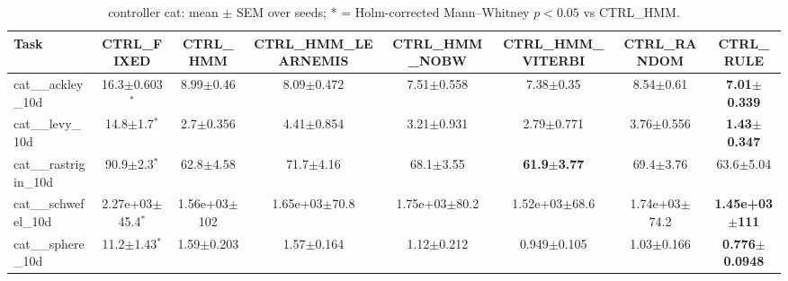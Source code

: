 \begin{table}[t]
\caption{controller cat: mean $\pm$ SEM over seeds; * = Holm-corrected Mann--Whitney $p<0.05$ vs CTRL_HMM.}
\label{tab:controller_cat}
\begin{center}\small
\begin{tabular}{lccccccc}
\hline
Task & CTRL\_FIXED & CTRL\_HMM & CTRL\_HMM\_LEARNEMIS & CTRL\_HMM\_NOBW & CTRL\_HMM\_VITERBI & CTRL\_RANDOM & CTRL\_RULE \\
\hline
cat\_\_ackley\_10d & 16.3$\pm$0.603$^{*}$ & 8.99$\pm$0.46 & 8.09$\pm$0.472 & 7.51$\pm$0.558 & 7.38$\pm$0.35 & 8.54$\pm$0.61 & \textbf{7.01$\pm$0.339} \\
cat\_\_levy\_10d & 14.8$\pm$1.7$^{*}$ & 2.7$\pm$0.356 & 4.41$\pm$0.854 & 3.21$\pm$0.931 & 2.79$\pm$0.771 & 3.76$\pm$0.556 & \textbf{1.43$\pm$0.347} \\
cat\_\_rastrigin\_10d & 90.9$\pm$2.3$^{*}$ & 62.8$\pm$4.58 & 71.7$\pm$4.16 & 68.1$\pm$3.55 & \textbf{61.9$\pm$3.77} & 69.4$\pm$3.76 & 63.6$\pm$5.04 \\
cat\_\_schwefel\_10d & 2.27e+03$\pm$45.4$^{*}$ & 1.56e+03$\pm$102 & 1.65e+03$\pm$70.8 & 1.75e+03$\pm$80.2 & 1.52e+03$\pm$68.6 & 1.74e+03$\pm$74.2 & \textbf{1.45e+03$\pm$111} \\
cat\_\_sphere\_10d & 11.2$\pm$1.43$^{*}$ & 1.59$\pm$0.203 & 1.57$\pm$0.164 & 1.12$\pm$0.212 & 0.949$\pm$0.105 & 1.03$\pm$0.166 & \textbf{0.776$\pm$0.0948} \\
\hline
\end{tabular}
\end{center}
\end{table}